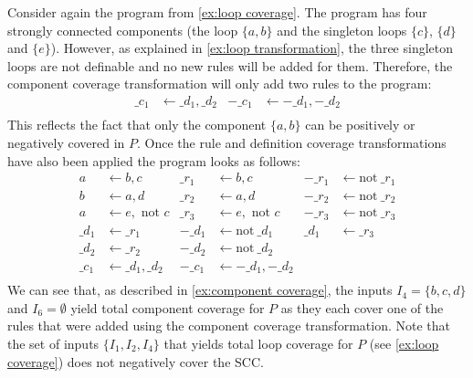 \begin{example}
\label{ex:component transformation}
    Consider again the program from \cref{ex:loop coverage}. The program has four strongly connected components (the loop \(\{a, b\}\) and the singleton loops $\{c\}$, $\{d\}$ and $\{e\}$). However, as explained in \cref{ex:loop transformation}, the three singleton loops are not definable and no new rules will be added for them. Therefore, the component coverage transformation will only add two rules to the program:
    \begin{align*}
        \_c_1 &\leftarrow \_d_1, \_d_2  &  -\_c_1 &\leftarrow -\_d_1, -\_d_2 \\
    \end{align*}
    This reflects the fact that only the component \(\{a, b\}\) can be positively or negatively covered in $P$. Once the rule and definition coverage transformations have also been applied the program looks as follows:
    \begin{align*}
        a     &\leftarrow b, c               &  \_r_1   &\leftarrow b, c                 & -\_r_1 &\leftarrow \text{not}\ \_r_1  \\  
        b     &\leftarrow a, d               &  \_r_2   &\leftarrow a, d                 & -\_r_2 &\leftarrow \text{not}\ \_r_2  \\  
        a     &\leftarrow e, \text{ not } c  &  \_r_3   &\leftarrow e, \text{ not } c    & -\_r_3 &\leftarrow \text{not}\ \_r_3  \\
        \_d_1 &\leftarrow \_r_1              &   -\_d_1 &\leftarrow \text{not}\ \_d_1  &  \_d_1 &\leftarrow \_r_3 \\
        \_d_2 &\leftarrow \_r_2              &   -\_d_2 &\leftarrow \text{not}\ \_d_2 \\
        \_c_1 &\leftarrow \_d_1, \_d_2       & -\_c_1   &\leftarrow -\_d_1, -\_d_2 \\
    \end{align*}
    We can see that, as described in \cref{ex:component coverage}, the inputs \(I_4 = \{b, c, d\}\) and \(I_6 = \emptyset\) yield total component coverage for $P$ as they each cover one of the rules that were added using the component coverage transformation. Note that the set of inputs \(\{I_1, I_2, I_4\}\) that yields total loop coverage for $P$ (see \cref{ex:loop coverage}) does not negatively cover the SCC.
\end{example}

